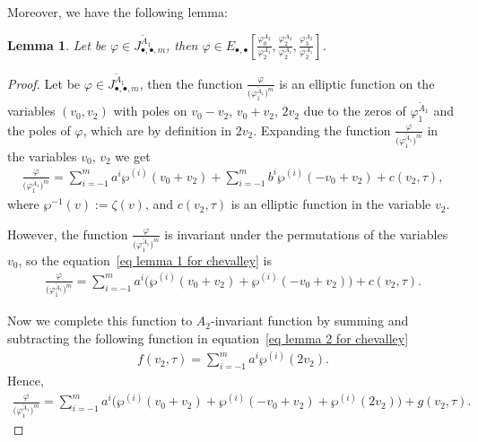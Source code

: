 \documentclass[pdftex]{sigma}%
\numberwithin{equation}{section}
\newtheorem{Lemma}[Theorem]{Lemma}
\begin{document}
Moreover, we have the following lemma:
\begin{Lemma}
Let be $\varphi\in J_{\bullet,\bullet,m}^{\tilde A_1}$, then $\varphi \in E_{\bullet,\bullet}\left[\frac{\varphi_0^{A_{2}}}{\varphi_2^{A_1}}, \frac{\varphi_2^{A_{2}}}{\varphi_2^{A_1}},\frac{\varphi_3^{A_{2}}}{\varphi_2^{A_1}}\right]$.
\end{Lemma}

\begin{proof}
Let be $\varphi\in J_{\bullet,\bullet,m}^{\tilde A_1}$, then the function $\frac{\varphi}{\big(\varphi_1^{\tilde A_1}\big)^m}$ is an elliptic function on the variables $(v_0,v_2)$ with poles on $v_0-v_2$, $v_0+v_2$, $2v_2$ due to the zeros of $\varphi_1^{\tilde A_1}$ and the poles of $\varphi$, which are by definition in $2v_2$. Expanding the function $\frac{\varphi}{\big(\varphi_1^{\tilde A_1}\big)^m}$ in the variables $v_0$, $v_2$ we get{\samepage
\begin{gather}
\label{eq lemma 1 for chevalley}
\frac{\varphi}{\big(\varphi_1^{\tilde A_1}\big)^m}=\sum_{i=-1}^{m} a^i\wp^{(i)}(v_0+v_{2})+\sum_{i=-1}^{m} b^i\wp^{(i)}(-v_0+v_{2})+c(v_2,\tau),
\end{gather}
where $\wp^{-1}(v):=\zeta(v)$, and $c(v_2,\tau)$ is an elliptic function in the variable $v_2$.}

However, the function $\frac{\varphi}{\big(\varphi_1^{\tilde A_1}\big)^m}$ is invariant under the permutations of the variables $v_0$, so the equation~\eqref{eq lemma 1 for chevalley} is
\begin{gather}
\label{eq lemma 2 for chevalley}
\frac{\varphi}{\big(\varphi_1^{\tilde A_1}\big)^m}=\sum_{i=-1}^{m} a^i\big(\wp^{(i)}(v_0+v_{2})+\wp^{(i)}(-v_0+v_{2})\big)+c(v_2,\tau).
\end{gather}

Now we complete this function to $A_{2}$-invariant function by summing and subtracting the following function in equation~\eqref{eq lemma 2 for chevalley}
\begin{gather*}
f(v_{2},\tau)=\sum_{i=-1}^{m} a^i\wp^{(i)}(2v_2).
\end{gather*}
Hence,
\begin{gather}
\label{eq lemma 3 for chevalley}
\frac{\varphi}{\big(\varphi_1^{\tilde A_1}\big)^m}=\sum_{i=-1}^{m} a^i\big(\wp^{(i)}(v_0+v_{2})+\wp^{(i)}(-v_0+v_{2})+\wp^{(i)}(2v_2)\big)+g(v_2,\tau).
\end{gather}


\end{proof}
\end{document}
